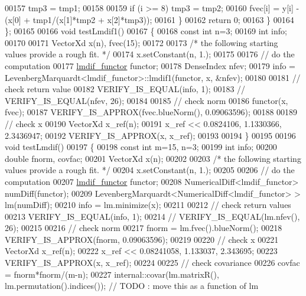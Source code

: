 \begin{DoxyCode}
00157             tmp3 = tmp1;
00158 
00159             \textcolor{keywordflow}{if} (i >= 8) tmp3 = tmp2;
00160             fvec[i] = y[i] - (x[0] + tmp1/(x[1]*tmp2 + x[2]*tmp3));
00161         \}
00162         \textcolor{keywordflow}{return} 0;
00163     \}
00164 \};
00165 
00166 \textcolor{keywordtype}{void} testLmdif1()
00167 \{
00168   \textcolor{keyword}{const} \textcolor{keywordtype}{int} n=3;
00169   \textcolor{keywordtype}{int} info;
00170 
00171   VectorXd x(n), fvec(15);
00172 
00173   \textcolor{comment}{/* the following starting values provide a rough fit. */}
00174   x.setConstant(n, 1.);
00175 
00176   \textcolor{comment}{// do the computation}
00177   \hyperlink{structlmdif__functor}{lmdif\_functor} functor;
00178   DenseIndex nfev;
00179   info = LevenbergMarquardt<lmdif\_functor>::lmdif1(functor, x, &nfev);
00180 
00181   \textcolor{comment}{// check return value}
00182   VERIFY\_IS\_EQUAL(info, 1);
00183 \textcolor{comment}{//   VERIFY\_IS\_EQUAL(nfev, 26);}
00184 
00185   \textcolor{comment}{// check norm}
00186   functor(x, fvec);
00187   VERIFY\_IS\_APPROX(fvec.blueNorm(), 0.09063596);
00188 
00189   \textcolor{comment}{// check x}
00190   VectorXd x\_ref(n);
00191   x\_ref << 0.0824106, 1.1330366, 2.3436947;
00192   VERIFY\_IS\_APPROX(x, x\_ref);
00193 
00194 \}
00195 
00196 \textcolor{keywordtype}{void} testLmdif()
00197 \{
00198   \textcolor{keyword}{const} \textcolor{keywordtype}{int} m=15, n=3;
00199   \textcolor{keywordtype}{int} info;
00200   \textcolor{keywordtype}{double} fnorm, covfac;
00201   VectorXd x(n);
00202 
00203   \textcolor{comment}{/* the following starting values provide a rough fit. */}
00204   x.setConstant(n, 1.);
00205 
00206   \textcolor{comment}{// do the computation}
00207   \hyperlink{structlmdif__functor}{lmdif\_functor} functor;
00208   NumericalDiff<lmdif\_functor> numDiff(functor);
00209   LevenbergMarquardt<NumericalDiff<lmdif\_functor> > lm(numDiff);
00210   info = lm.minimize(x);
00211 
00212   \textcolor{comment}{// check return values}
00213   VERIFY\_IS\_EQUAL(info, 1);
00214 \textcolor{comment}{//   VERIFY\_IS\_EQUAL(lm.nfev(), 26);}
00215 
00216   \textcolor{comment}{// check norm}
00217   fnorm = lm.fvec().blueNorm();
00218   VERIFY\_IS\_APPROX(fnorm, 0.09063596);
00219 
00220   \textcolor{comment}{// check x}
00221   VectorXd x\_ref(n);
00222   x\_ref << 0.08241058, 1.133037, 2.343695;
00223   VERIFY\_IS\_APPROX(x, x\_ref);
00224 
00225   \textcolor{comment}{// check covariance}
00226   covfac = fnorm*fnorm/(m-n);
00227   internal::covar(lm.matrixR(), lm.permutation().indices()); \textcolor{comment}{// TODO : move this as a function of lm}

\end{DoxyCode}
